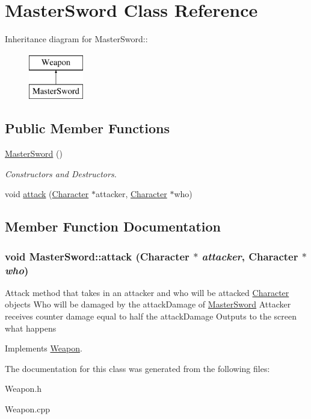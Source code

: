\hypertarget{classMasterSword}{
\section{MasterSword Class Reference}
\label{classMasterSword}
}
Inheritance diagram for MasterSword::\begin{figure}[H]
\begin{center}
\leavevmode
\includegraphics[height=2cm]{classMasterSword}
\end{center}
\end{figure}
\subsection*{Public Member Functions}
\begin{DoxyCompactItemize}
\item 
\hypertarget{classMasterSword_a032920b9abdd54a80efc69c81c90900d}{
\hyperlink{classMasterSword_a032920b9abdd54a80efc69c81c90900d}{MasterSword} ()}
\label{classMasterSword_a032920b9abdd54a80efc69c81c90900d}

\begin{DoxyCompactList}\small\item\em Constructors and Destructors. \item\end{DoxyCompactList}\item 
void \hyperlink{classMasterSword_ac407c8f47fdcb95d8404a33aed004358}{attack} (\hyperlink{classCharacter}{Character} $\ast$attacker, \hyperlink{classCharacter}{Character} $\ast$who)
\end{DoxyCompactItemize}


\subsection{Member Function Documentation}
\hypertarget{classMasterSword_ac407c8f47fdcb95d8404a33aed004358}{
\subsubsection[{attack}]{\setlength{\rightskip}{0pt plus 5cm}void MasterSword::attack ({\bf Character} $\ast$ {\em attacker}, \/  {\bf Character} $\ast$ {\em who})}}
\label{classMasterSword_ac407c8f47fdcb95d8404a33aed004358}
Attack method that takes in an attacker and who will be attacked \hyperlink{classCharacter}{Character} objects Who will be damaged by the attackDamage of \hyperlink{classMasterSword}{MasterSword} Attacker receives counter damage equal to half the attackDamage Outputs to the screen what happens 

Implements \hyperlink{classWeapon_a74d99dd40d8872718710bcf94fff98d7}{Weapon}.

The documentation for this class was generated from the following files:\begin{DoxyCompactItemize}
\item 
Weapon.h\item 
Weapon.cpp\end{DoxyCompactItemize}
